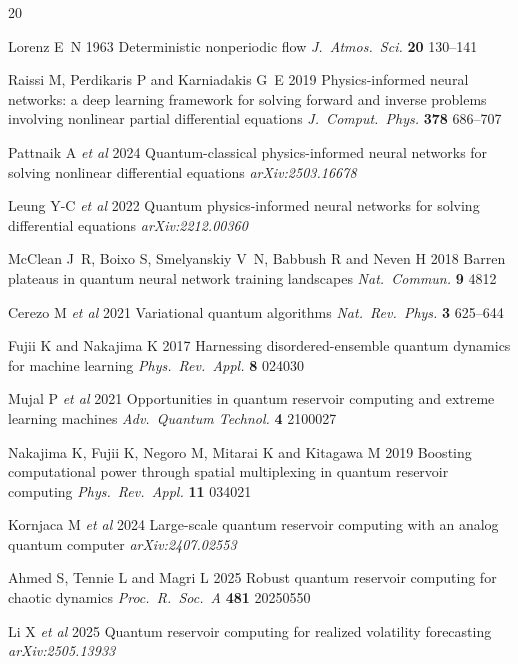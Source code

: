 \documentclass[a4paper,12pt]{iopart}
\begin{document}
\begin{thebibliography}{20}

 Lorenz E~N 1963 Deterministic nonperiodic flow
\textit{J.\ Atmos.\ Sci.} \textbf{20} 130--141

 Raissi M, Perdikaris P and Karniadakis G~E 2019
Physics-informed neural networks: a deep learning framework for
solving forward and inverse problems involving nonlinear partial
differential equations \textit{J.\ Comput.\ Phys.} \textbf{378}
686--707

 Pattnaik A \textit{et al} 2024 Quantum-classical
physics-informed neural networks for solving nonlinear differential
equations \textit{arXiv:2503.16678}

 Leung Y-C \textit{et al} 2022 Quantum
physics-informed neural networks for solving differential equations
\textit{arXiv:2212.00360}

 McClean J~R, Boixo S, Smelyanskiy V~N,
Babbush R and Neven H 2018 Barren plateaus in quantum neural network
training landscapes \textit{Nat.\ Commun.} \textbf{9} 4812

 Cerezo M \textit{et al} 2021 Variational quantum
algorithms \textit{Nat.\ Rev.\ Phys.} \textbf{3} 625--644

 Fujii K and Nakajima K 2017 Harnessing
disordered-ensemble quantum dynamics for machine learning
\textit{Phys.\ Rev.\ Appl.} \textbf{8} 024030

 Mujal P \textit{et al} 2021 Opportunities in
quantum reservoir computing and extreme learning machines
\textit{Adv.\ Quantum Technol.} \textbf{4} 2100027

 Nakajima K, Fujii K, Negoro M, Mitarai
K and Kitagawa M 2019 Boosting computational power through spatial
multiplexing in quantum reservoir computing \textit{Phys.\ Rev.\ Appl.}
\textbf{11} 034021

 Kornjaca M \textit{et al} 2024
Large-scale quantum reservoir computing with an analog quantum
computer \textit{arXiv:2407.02553}

 Ahmed S, Tennie L and Magri L 2025 Robust
quantum reservoir computing for chaotic dynamics \textit{Proc.\ R.\ Soc.\ A}
\textbf{481} 20250550

 Li X \textit{et al} 2025 Quantum reservoir
computing for realized volatility forecasting \textit{arXiv:2505.13933}


\end{thebibliography}
\end{document}
